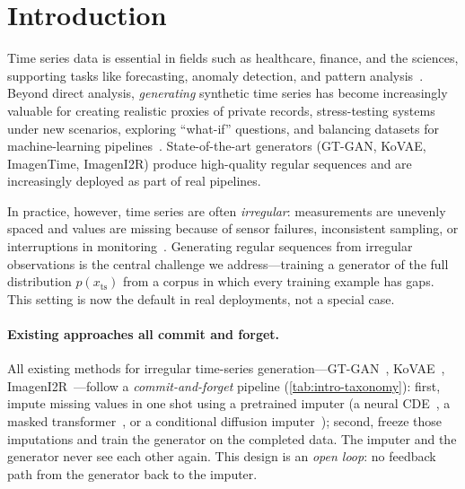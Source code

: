 \documentclass{article}
\theoremstyle{plain}
\theoremstyle{definition}
\theoremstyle{remark}
\newcommand{\xts}{x_{\mathrm{ts}}}
\begin{document}
\vspace{-3mm}
\section{Introduction}
\label{sec:intro}
\vspace{-1mm}

Time series data is essential in fields such as healthcare, finance, and the sciences, supporting tasks like forecasting, anomaly detection, and pattern analysis~\citep{han2019review,ismail2019deep,lim2021time}. Beyond direct analysis, \emph{generating} synthetic time series has become increasingly valuable for creating realistic proxies of private records, stress-testing systems under new scenarios, exploring ``what-if'' questions, and balancing datasets for machine-learning pipelines~\citep{brophy2023generative,nochumsohn2025data}. State-of-the-art generators (GT-GAN, KoVAE, ImagenTime, ImagenI2R) produce high-quality regular sequences and are increasingly deployed as part of real pipelines.

In practice, however, time series are often \emph{irregular}: measurements are unevenly spaced and values are missing because of sensor failures, inconsistent sampling, or interruptions in monitoring~\citep{kidger2020ncde,ren2024learning}. Generating regular sequences from irregular observations is the central challenge we address---training a generator of the full distribution $p(\xts)$ from a corpus in which every training example has gaps. This setting is now the default in real deployments, not a special case.

\paragraph{Existing approaches all commit and forget.}
All existing methods for irregular time-series generation---GT-GAN~\citep{jeon2022gtgan}, KoVAE~\citep{naiman2024kovae}, ImagenI2R~\citep{fadlon2025imageni2r}---follow a \emph{commit-and-forget} pipeline (\cref{tab:intro-taxonomy}): first, impute missing values in one shot using a pretrained imputer (a neural CDE~\citep{kidger2020ncde}, a masked transformer~\citep{zerveas2021tst}, or a conditional diffusion imputer~\citep{tashiro2021csdi}); second, freeze those imputations and train the generator on the completed data. The imputer and the generator never see each other again. This design is an \emph{open loop}: no feedback path from the generator back to the imputer.
\end{document}
